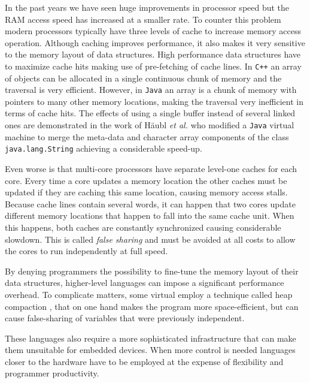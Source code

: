 In the past years we have seen huge improvements in processor speed but the RAM access speed has increased at
a smaller rate. To counter this problem modern processors typically have three levels of cache to increase
memory access operation. Although caching improves performance, it also makes it very sensitive to the memory
layout of data structures. High performance data structures have to maximize cache hits making use of
pre-fetching of cache lines. In \texttt{C++} an array of objects can be allocated in a single continuous chunk of memory
and the traversal is very efficient. However, in \texttt{Java} an array is a chunk of memory with pointers to
many other memory locations, making the traversal very inefficient in terms of cache hits. The effects of
using a single buffer instead of several linked ones are demonstrated in the work of Häubl \emph{et al.} who
modified a \texttt{Java} virtual machine to merge the meta-data and character array components of the class
\texttt{java.lang.String} achieving a considerable speed-up.

Even worse is that multi-core processors have separate level-one caches for each core. Every time a
core updates a memory location the other caches must be updated if they are caching this same location, causing
memory access stalls. Because cache lines contain several words, it can happen that two cores update
different memory locations that happen to fall into the same cache unit. When this happens, both caches
are constantly synchronized causing considerable slowdown. This is called \emph{false sharing} and must
be avoided at all costs to allow the cores to run independently at full speed.

By denying programmers the possibility to fine-tune the memory layout of their data structures,
higher-level languages can impose a significant performance overhead. To complicate matters, some virtual
employ a technique called heap compaction \cite{Clarke}, that on one hand makes the program more space-efficient, but can
cause false-sharing of variables that were previously independent.

These languages also require a more sophisticated infrastructure that can make them unsuitable for embedded devices.
When more control is needed languages closer to the hardware have to be employed at the expense
of flexibility and programmer productivity.


